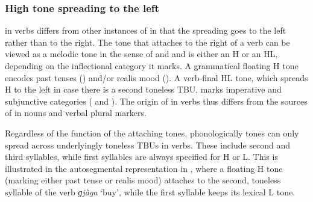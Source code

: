 \subsubsection{High tone spreading to the left}
\label{sec:HTSl}

{\HTS} in verbs  differs from other instances of {\HTS} in that the spreading goes to the left rather than to the right. The tone that attaches to the right of a verb can be viewed as a melodic tone in the sense of \citet{odden2014} and \citet{marlo2018} and is either an H or an HL, depending on the inflectional category it marks. A grammatical floating H tone encodes past tenses () and/or realis mood (). A verb-final HL tone, which spreads H to the left in case there is a second toneless TBU, marks imperative and subjunctive categories ( and ). The origin of {\HTS} in verbs thus differs from the sources of {\HTS} in nouns and verbal plural markers.

Regardless of the function of the attaching tones, phonologically tones can only spread across underlyingly toneless TBUs in verbs. These include second and third syllables, while first syllables are always specified for H or L. This is illustrated in the autosegmental representation in , where a floating H tone (marking either past tense or realis mood) attaches to the second, toneless syllable of the verb {\itshape ɡjàga} `buy', while the first syllable keeps its lexical L tone.








